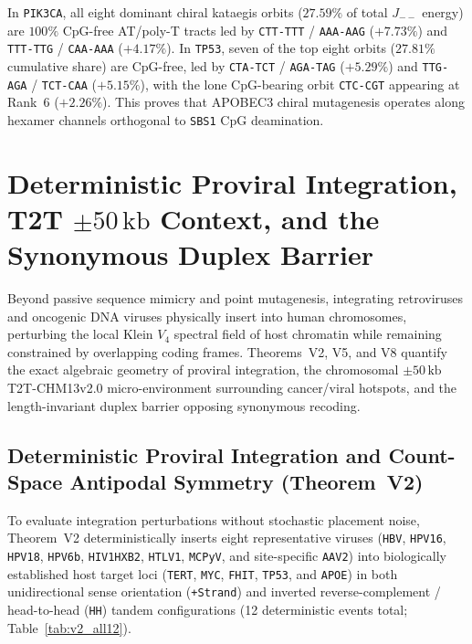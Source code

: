 \documentclass[11pt, a4paper]{article}
\DeclareRobustCommand{\_}{\textunderscore\allowbreak}
\begin{document}
In \texttt{PIK3CA}, all eight dominant chiral kataegis orbits ($27.59\%$ of total $J_{--}$ energy) are $100\%$ CpG-free AT/poly-T tracts led by \texttt{CTT-TTT} / \texttt{AAA-AAG} ($+7.73\%$) and \texttt{TTT-TTG} / \texttt{CAA-AAA} ($+4.17\%$). In \texttt{TP53}, seven of the top eight orbits ($27.81\%$ cumulative share) are CpG-free, led by \texttt{CTA-TCT} / \texttt{AGA-TAG} ($+5.29\%$) and \texttt{TTG-AGA} / \texttt{TCT-CAA} ($+5.15\%$), with the lone CpG-bearing orbit \texttt{CTC-CGT} appearing at Rank~6 ($+2.26\%$). This proves that APOBEC3 chiral mutagenesis operates along hexamer channels orthogonal to \texttt{SBS1} CpG deamination.

\section{Deterministic Proviral Integration, T2T $\pm 50\,\mathrm{kb}$ Context, and the Synonymous Duplex Barrier}
\label{sec:integration}

Beyond passive sequence mimicry and point mutagenesis, integrating retroviruses and oncogenic DNA viruses physically insert into human chromosomes, perturbing the local Klein $V_4$ spectral field of host chromatin while remaining constrained by overlapping coding frames. Theorems~V2, V5, and V8 quantify the exact algebraic geometry of proviral integration, the chromosomal $\pm 50\,\mathrm{kb}$ T2T-CHM13v2.0 micro-environment surrounding cancer/viral hotspots, and the length-invariant duplex barrier opposing synonymous recoding.

\subsection{Deterministic Proviral Integration and Count-Space Antipodal Symmetry (Theorem~V2)}

To evaluate integration perturbations without stochastic placement noise, Theorem~V2 deterministically inserts eight representative viruses (\texttt{HBV}, \texttt{HPV16}, \texttt{HPV18}, \texttt{HPV6b}, \texttt{HIV1\_HXB2}, \texttt{HTLV1}, \texttt{MCPyV}, and site-specific \texttt{AAV2}) into biologically established host target loci (\texttt{TERT}, \texttt{MYC}, \texttt{FHIT}, \texttt{TP53}, and \texttt{APOE}) in both unidirectional sense orientation (\texttt{+Strand}) and inverted reverse-complement / head-to-head (\texttt{HH}) tandem configurations (12 deterministic events total; Table~\ref{tab:v2_all12}).
\end{document}
